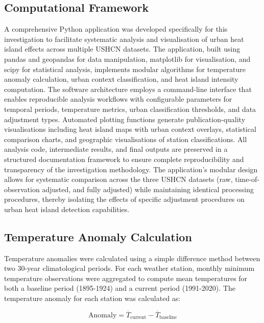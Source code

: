 \documentclass[11pt, a4paper]{article}
\begin{document}
  \subsection{Computational Framework}

A comprehensive Python application was developed specifically for this investigation to facilitate systematic analysis and visualisation of urban heat island effects across multiple USHCN datasets. The application, built using pandas and geopandas for data manipulation, matplotlib for visualisation, and scipy for statistical analysis, implements modular algorithms for temperature anomaly calculation, urban context classification, and heat island intensity computation. The software architecture employs a command-line interface that enables reproducible analysis workflows with configurable parameters for temporal periods, temperature metrics, urban classification thresholds, and data adjustment types. Automated plotting functions generate publication-quality visualisations including heat island maps with urban context overlays, statistical comparison charts, and geographic visualisations of station classifications. All analysis code, intermediate results, and final outputs are preserved in a structured documentation framework to ensure complete reproducibility and transparency of the investigation methodology. The application's modular design allows for systematic comparison across the three USHCN datasets (raw, time-of-observation adjusted, and fully adjusted) while maintaining identical processing procedures, thereby isolating the effects of specific adjustment procedures on urban heat island detection capabilities.

\subsection{Temperature Anomaly Calculation}

Temperature anomalies were calculated using a simple difference method between two 30-year climatological periods. For each weather station, monthly minimum temperature observations were aggregated to compute mean temperatures for both a baseline period (1895-1924) and a current period (1991-2020). The temperature anomaly for each station was calculated as: 

\begin{equation} \text{Anomaly} = \overline{T}_{\text{current}} - \overline{T}_{\text{baseline}} \end{equation}
\end{document}
